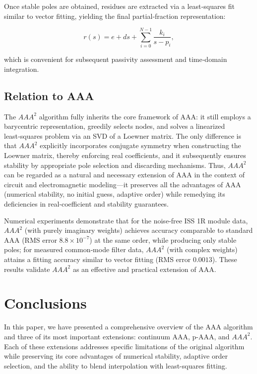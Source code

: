 \documentclass{article}
\begin{document}
Once stable poles are obtained, residues are extracted via a least‑squares fit similar to vector fitting, yielding the final partial‑fraction representation:

\[
r(s) = e + ds + \sum_{i=0}^{N-1} \frac{k_i}{s - p_i}, \tag{15}
\]

which is convenient for subsequent passivity assessment and time‑domain integration.

\subsection{Relation to AAA}

The $AAA^{2}$ algorithm fully inherits the core framework of AAA: it still employs a barycentric representation, greedily selects nodes, and solves a linearized least‑squares problem via an SVD of a Loewner matrix. The only difference is that $AAA^{2}$ explicitly incorporates conjugate symmetry when constructing the Loewner matrix, thereby enforcing real coefficients, and it subsequently ensures stability by appropriate pole selection and discarding mechanisms. Thus, $AAA^{2}$ can be regarded as a natural and necessary extension of AAA in the context of circuit and electromagnetic modeling—it preserves all the advantages of AAA (numerical stability, no initial guess, adaptive order) while remedying its deficiencies in real‑coefficient and stability guarantees.

Numerical experiments demonstrate that for the noise‑free ISS 1R module data, $AAA^{2}$ (with purely imaginary weights) achieves accuracy comparable to standard AAA (RMS error \(8.8\times10^{-7}\)) at the same order, while producing only stable poles; for measured common‑mode filter data, $AAA^{2}$ (with complex weights) attains a fitting accuracy similar to vector fitting (RMS error \(0.0013\)). These results validate $AAA^{2}$ as an effective and practical extension of AAA.

\section{Conclusions}

In this paper, we have presented a comprehensive overview of the AAA algorithm and three of its most important extensions: continuum AAA, p-AAA, and $AAA^{2}$. Each of these extensions addresses specific limitations of the original algorithm while preserving its core advantages of numerical stability, adaptive order selection, and the ability to blend interpolation with least-squares fitting.
\end{document}
